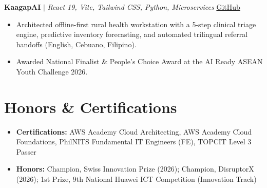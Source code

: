 \documentclass[10pt,letterpaper]{article}
\begin{document}
\vspace{2pt}
\textbf{KaagapAI} $|$ \textit{React 19, Vite, Tailwind CSS, Python, Microservices} \hfill \href{https://github.com/simon-escano}{GitHub}
\begin{itemize}
  \item Architected offline-first rural health workstation with a 5-step clinical triage engine, predictive inventory forecasting, and automated trilingual referral handoffs (English, Cebuano, Filipino).
  \item Awarded National Finalist \& People's Choice Award at the AI Ready ASEAN Youth Challenge 2026.
\end{itemize}

\section{Honors \& Certifications}
\begin{itemize}[leftmargin=*,label={}]
  \item \textbf{Certifications:} AWS Academy Cloud Architecting, AWS Academy Cloud Foundations, PhilNITS Fundamental IT Engineers (FE), TOPCIT Level 3 Passer
  \item \textbf{Honors:} Champion, Swiss Innovation Prize (2026); Champion, DisruptorX (2026); 1st Prize, 9th National Huawei ICT Competition (Innovation Track)
\end{itemize}
\end{document}
